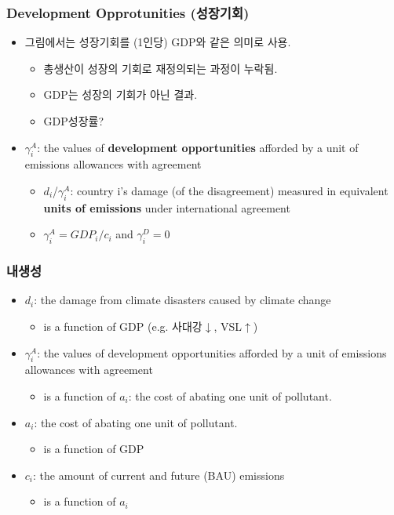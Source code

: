 \documentclass[aspectratio=169,xcolor=dvipsnames,handout]{beamer}
\begin{document}
\begin{frame}
    \frametitle{Development Opprotunities (성장기회)}
    \begin{itemize}[<+->]
        \item 그림에서는 성장기회를 (1인당) GDP와 같은 의미로 사용.
        \begin{itemize}[<+->]
            \item 총생산이 성장의 기회로 재정의되는 과정이 누락됨.
            \item GDP는 성장의 기회가 아닌 결과.
            \item GDP성장률?
        \end{itemize}
        \item $\gamma^A_i$: the values of \textbf{development opportunities} afforded by a unit of emissions allowances with agreement
        \begin{itemize}[<+->]
            \item $d_i$/$\gamma^A_i$: country i’s damage (of the disagreement) measured in equivalent \textbf{units of emissions} under international agreement
            \item $\gamma^A_i = GDP_i/c_i$ and $\gamma^D_i = 0$ 
        \end{itemize}
    \end{itemize}
\end{frame}

\begin{frame}
    \frametitle{내생성}
    \begin{itemize}[<+->]
        \item $d_i$: the damage from climate disasters caused by climate change
        \begin{itemize}
            \item is a function of GDP (e.g. 사대강$\downarrow$, VSL$\uparrow$)
        \end{itemize}
        \item $\gamma^A_i$: the values of development opportunities afforded by a unit of emissions allowances with agreement
        \begin{itemize}
            \item is a function of $a_i$: the cost of abating one unit of pollutant.
        \end{itemize}
        \item $a_i$: the cost of abating one unit of pollutant.
        \begin{itemize}
            \item is a function of GDP
        \end{itemize}
        \item $c_i$: the amount of current and future (BAU) emissions
        \begin{itemize}
            \item is a function of $a_i$
        \end{itemize}
    \end{itemize}
\end{frame}
\end{document}
